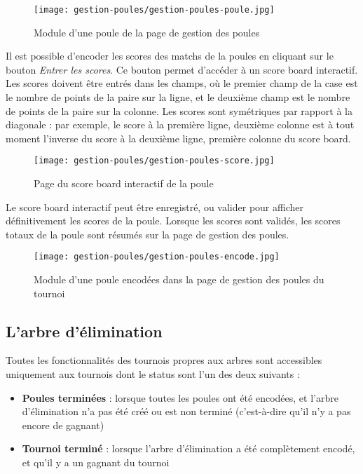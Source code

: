 \begin{figure}[H]
\centering
\texttt{[image: gestion-poules/gestion-poules-poule.jpg]}
\caption{Module d'une poule de la page de gestion des poules}
\end{figure}

Il est possible d'encoder les scores des matchs de la poules en cliquant sur le bouton \textit{Entrer les scores}. Ce bouton permet d'accéder à un score board interactif. Les scores doivent être entrés dans les champs, où le premier champ de la case est le nombre de points de la paire sur la ligne, et le deuxième champ est le nombre de points de la paire sur la colonne. Les scores sont symétriques par rapport à la diagonale : par exemple, le score à la première ligne, deuxième colonne est à tout moment l'inverse du score à la deuxième ligne, première colonne du score board.

\begin{figure}[H]
\centering
\texttt{[image: gestion-poules/gestion-poules-score.jpg]}
\caption{Page du score board interactif de la poule}
\end{figure}

Le score board interactif peut être enregistré, ou valider pour afficher définitivement les scores de la poule. Lorsque les scores sont validés, les scores totaux de la poule sont résumés sur la page de gestion des poules.

\begin{figure}[H]
\centering
\texttt{[image: gestion-poules/gestion-poules-encode.jpg]}
\caption{Module d'une poule encodées dans la page de gestion des poules du tournoi}
\end{figure}

\subsection{L'arbre d'élimination}

Toutes les fonctionnalités des tournois propres aux arbres sont accessibles uniquement aux tournois dont le status sont l'un des deux suivants :

\begin{itemize}
\item \textbf{Poules terminées} : lorsque toutes les poules ont été encodées, et l'arbre d'élimination n'a pas été créé ou est non terminé (c'est-à-dire qu'il n'y a pas encore de gagnant)
\item \textbf{Tournoi terminé} : lorsque l'arbre d'élimination a été complètement encodé, et qu'il y a un gagnant du tournoi
\end{itemize}
\bigskip

